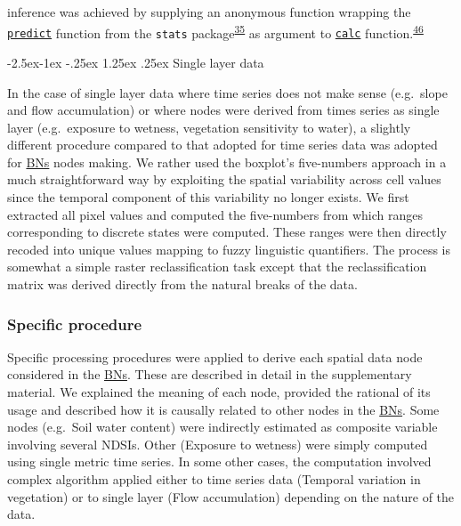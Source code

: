 \documentclass[12pt,oneside]{article}
\makeatletter
\renewcommand\paragraph{\@startsection{paragraph}{4}{\z@}%
            {-2.5ex\@plus -1ex \@minus -.25ex}%
            {1.25ex \@plus .25ex}%
            {\normalfont\normalsize\bfseries}}
\makeatother
\begin{document}
inference was achieved by supplying an anonymous function wrapping the \href{https://www.rdocumentation.org/packages/stats/versions/3.5.2/topics/predict}{\texttt{predict}} function from the \texttt{stats} package\textsuperscript{\protect\hyperlink{ref-RCoreTeam_2018}{35}} as argument to \href{https://www.rdocumentation.org/packages/raster/versions/2.8-19/topics/calc}{\texttt{calc}} function.\textsuperscript{\protect\hyperlink{ref-Hijmans_2019}{46}}

\hypertarget{I512}{%
\paragraph{Single layer data}\label{I512}}

In the case of single layer data where time series does not make sense (e.g.~slope and flow accumulation) or where nodes were derived from times series as single layer (e.g.~exposure to wetness, vegetation sensitivity to water), a slightly different procedure compared to that adopted for time series data was adopted for \href{https://en.wikipedia.org/wiki/Bayesian_network}{BNs} nodes making. We rather used the boxplot's five-numbers approach in a much straightforward way by exploiting the spatial variability across cell values since the temporal component of this variability no longer exists. We first extracted all pixel values and computed the five-numbers from which ranges corresponding to discrete states were computed. These ranges were then directly recoded into unique values mapping to fuzzy linguistic quantifiers. The process is somewhat a simple raster reclassification task except that the reclassification matrix was derived directly from the natural breaks of the data.

\hypertarget{I52}{%
\subsubsection{Specific procedure}\label{I52}}

Specific processing procedures were applied to derive each spatial data node considered in the \href{https://en.wikipedia.org/wiki/Bayesian_network}{BNs}. These are described in detail in the supplementary material. We explained the meaning of each node, provided the rational of its usage and described how it is causally related to other nodes in the \href{https://en.wikipedia.org/wiki/Bayesian_network}{BNs}. Some nodes (e.g.~Soil water content) were indirectly estimated as composite variable involving several NDSIs. Other (Exposure to wetness) were simply computed using single metric time series. In some other cases, the computation involved complex algorithm applied either to time series data (Temporal variation in vegetation) or to single layer (Flow accumulation) depending on the nature of the data.
\end{document}
